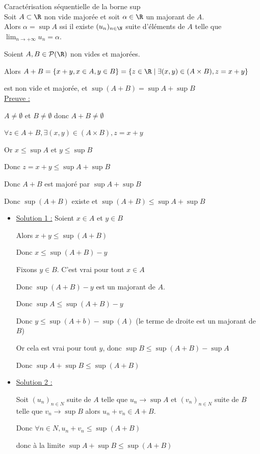 \begin{theoreme}{Caractérisation séquentielle de la borne sup}{}
    \\Soit $A \subset \R$ non vide majorée et soit $\alpha \in \R$ un majorant de $A$. \\

    Alors $\alpha = \sup A$ ssi il existe $(u_n)_{n \in \N}$ suite d'éléments de $A$
    telle que $\lim_{n \to + \infty} u_n = \alpha$.
\end{theoreme}


\begin{exemple}
    Soient $A, B \in \mathcal P(\R)$ non vides et majorées. 

    Alors $A + B = \{x + y, x \in A, y \in B\} = \{z \in \R \mid \exists (x, y) \in (A \times B), z = x + y\}$

    est non vide et majorée, et $\sup( A + B) = \sup A + \sup B$ \\

    \uline{Preuve :}

    $A \neq \emptyset$ et $B \neq \emptyset$ donc $A + B \neq \emptyset$ 

    $\forall z \in A + B, \exists(x, y) \in (A \times B), z = x + y$

    Or $x \leqslant \sup A $ et $y \leqslant \sup B$

    Donc $z = x + y \leqslant \sup A + \sup B$

    Donc $A + B$ est majoré par $\sup A + \sup B$

    Donc $\sup( A+ B)$ existe et $\sup (A + B) \leqslant \sup A + \sup B$

    \begin{itemize}
        \item \uline{Solution 1 :}
        Soient $x \in A$ et $y \in B$ 

        Alors $x + y \leqslant \sup(A + B)$

        Donc $x \leqslant \sup(A + B) - y$

        Fixons $y \in B$. C'est vrai pour tout $x \in A$

        Donc $\sup(A + B) - y$ est un majorant de $A$. 

        Donc $\sup A \leqslant \sup(A + B) - y$

        Donc $y \leqslant \sup(A + b) - \sup(A)$ (le terme de droite est un majorant de $B$)

        Or cela est vrai pour tout $y$, donc $\sup B \leqslant \sup(A + B) - \sup A$

        Donc $\sup A + \sup B \leqslant \sup(A + B)$

        \item \uline{Solution 2 :}

        Soit $(u_n)_{n \in N}$ suite de $A$ telle que $u_n \longrightarrow \sup A$
        et $(v_n)_{n \in N}$ suite de $B$ telle que $ v_n \longrightarrow \sup B$
        alors $u_n + v_n \in A + B$. 

        Donc $\forall n \in N, u_n + v_n \leqslant \sup(A + B)$
    
        donc à la limite $\sup A + \sup B \leqslant \sup(A + B)$
    \end{itemize}
\end{exemple}

